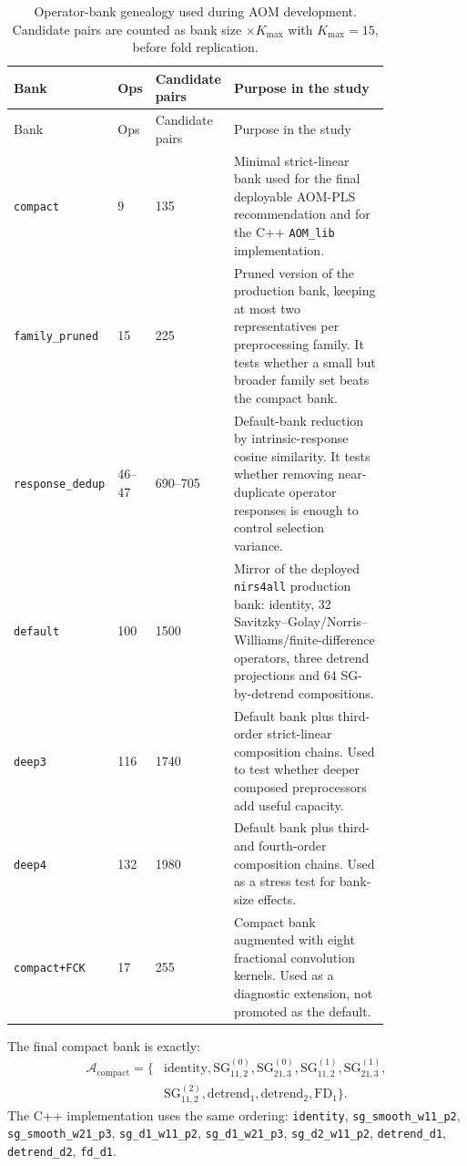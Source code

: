 \documentclass[11pt,a4paper]{article}
\newcommand{\code}[1]{\nolinkurl{#1}}
\begin{document}
\begin{longtable}{L{0.16\linewidth}L{0.09\linewidth}L{0.13\linewidth}L{0.44\linewidth}}
\caption{Operator-bank genealogy used during AOM development.  Candidate
pairs are counted as bank size $\times K_{\max}$ with $K_{\max}=15$, before
fold replication.}\\
\toprule
Bank & Ops & Candidate pairs & Purpose in the study \\
\midrule
\endfirsthead
\toprule
Bank & Ops & Candidate pairs & Purpose in the study \\
\midrule
\endhead
\code{compact} & 9 & 135 &
Minimal strict-linear bank used for the final deployable AOM-PLS
recommendation and for the C++ \code{AOM_lib} implementation.\\
\code{family_pruned} & 15 & 225 &
Pruned version of the production bank, keeping at most two representatives
per preprocessing family.  It tests whether a small but broader family set
beats the compact bank.\\
\code{response_dedup} & 46--47 & 690--705 &
Default-bank reduction by intrinsic-response cosine similarity.  It tests
whether removing near-duplicate operator responses is enough to control
selection variance.\\
\code{default} & 100 & 1500 &
Mirror of the deployed \code{nirs4all} production bank: identity, 32
Savitzky--Golay/Norris--Williams/finite-difference operators, three detrend
projections and 64 SG-by-detrend compositions.\\
\code{deep3} & 116 & 1740 &
Default bank plus third-order strict-linear composition chains.  Used to test
whether deeper composed preprocessors add useful capacity.\\
\code{deep4} & 132 & 1980 &
Default bank plus third- and fourth-order composition chains.  Used as a
stress test for bank-size effects.\\
\code{compact+FCK} & 17 & 255 &
Compact bank augmented with eight fractional convolution kernels.  Used as a
diagnostic extension, not promoted as the default.\\
\bottomrule
\end{longtable}

The final compact bank is exactly:
\begin{equation}
\begin{split}
\mathcal A_{\mathrm{compact}}=\{&
\mathrm{identity},
\mathrm{SG}_{11,2}^{(0)},\mathrm{SG}_{21,3}^{(0)},
\mathrm{SG}_{11,2}^{(1)},\mathrm{SG}_{21,3}^{(1)},\\
&\mathrm{SG}_{11,2}^{(2)},
\mathrm{detrend}_{1},\mathrm{detrend}_{2},
\mathrm{FD}_{1}\}.
\end{split}
\end{equation}
The C++ implementation uses the same ordering:
\code{identity},
\code{sg_smooth_w11_p2},
\code{sg_smooth_w21_p3},
\code{sg_d1_w11_p2},
\code{sg_d1_w21_p3},
\code{sg_d2_w11_p2},
\code{detrend_d1},
\code{detrend_d2},
\code{fd_d1}.
\end{document}
